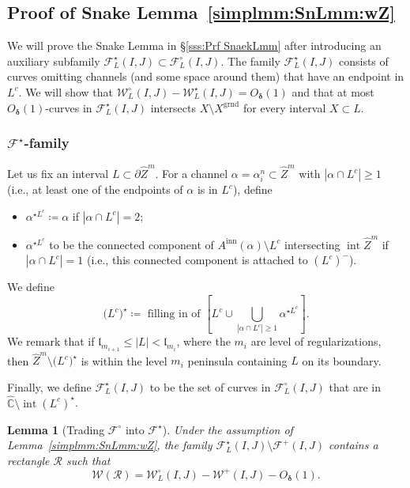 \documentclass{amsart}
\newcommand{\1}{{\mathbb 1 }}
\newcommand{\Fam}{{\mathcal F}}
\newcommand{\Width}{{\mathcal W}}
\newcommand\RR{\mathcal{R}}
\newcommand\intr{\operatorname{int}}
\newcommand{\wZ}{{\widehat Z}}
\newcommand{\str}{{\star}}
\newcommand{\length}{{\mathfrak l}}
\newcommand\inn{{\operatorname{inn}}}
\newcommand{\grnd}{{\operatorname{grnd}}}
\newcommand{\wC}{\widehat{\mathbb{C}}}
\newtheorem{lem}[thm]{Lemma}
\theoremstyle{remark}
\numberwithin{equation}{section}
\theoremstyle{definition}
\newcommand{\bdelta}{{\boldsymbol{ \delta}}}
\begin{document}
\subsection{Proof of Snake Lemma~\ref{simplmm:SnLmm:wZ}} We will prove the Snake Lemma in \S\ref{sss:Prf SnaekLmm} after introducing an auxiliary subfamily $\Fam^\str_L(I,J)\subset \Fam^\circ_L(I,J)$. The family $\Fam^\str_L(I,J)$ consists of curves omitting channels (and some space around them) that have an endpoint in $L^c$. We will show that $\Width^\circ_L(I,J)- \Width^\str_L(I,J)=O_\bdelta(1)$ and that at most $O_\bdelta(1)$-curves in $\Fam^\str_L(I,J)$ intersects $X\setminus X^\grnd$ for every interval $X\subset L$.
  




\subsubsection{$\Fam^\str$-family}
\label{ss:Fam^*} Let us fix an interval $L\subset\partial \wZ^m$. For a channel $\alpha=\alpha^n_i\subset \wZ^m$ with $|\alpha \cap L^c|\ge 1$ (i.e., at least one of the endpoints of $\alpha$ is in $L^c$), define
\begin{itemize}
\item $\alpha^{\str L^c}\coloneqq \alpha$ if $|\alpha\cap L^c|=2$;
\item $\alpha^{\str L^c}$ to be the connected component of $A^\inn(\alpha)\setminus L^c$ intersecting $\intr \wZ^m$ if $|\alpha\cap L^c|=1$ (i.e., this connected component is attached to $(L^c)^-$). 
\end{itemize}
We define \[\big(L^c\big)^{\str}\coloneqq \text{ filling in of } \left[ L^c\cup \bigcup _{|\alpha\cap L^c|\ge 1} \alpha^{\str L^c}\right].\]
We remark that if $\length_{m_{i+1}}\le |L|< \length_{m_i}$, where the $m_i$ are level of regularizations, then $\wZ^m\setminus \big(L^c\big)^{\str}$ is within the level $m_i$ peninsula containing $L$ on its boundary.

Finally, we define $\Fam^\str_L(I,J)$ to be the set of curves in $\Fam^\circ_L(I,J)$ that are in $\wC\setminus \intr (L^c)^\str$.


\begin{lem}[Trading $\Fam^\circ $ into $ \Fam^\str$]
\label{lem:A|_L} Under the assumption of Lemma~\ref{simplmm:SnLmm:wZ}, the family $\Fam^\str_L(I,J)\setminus \Fam^+(I,J)$ contains a rectangle $\RR$ such that
\[ \Width(\RR)= \Width^\circ_L(I,J)-\Width^+(I,J)-O_\bdelta(1).\]

\end{lem}
\end{document}
